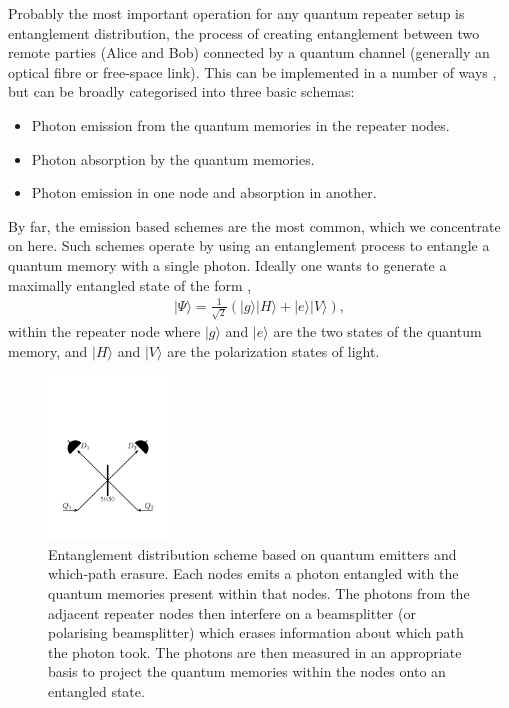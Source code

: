 \documentclass[twocolumn, aps, rmp, amsmath, amssymb, nofootinbib, superscriptaddress, longbibliography, floatfix, table-of-contents, eqsecnum]{revtex4-1}
\newcommand{\ket}[1]{|#1\rangle}
\begin{document}
Probably the most important operation for any quantum repeater setup is entanglement distribution, the process of creating entanglement between two remote parties (Alice and Bob) connected by a quantum channel (generally an optical fibre or free-space link). This can be implemented in a number of ways \cite{bib:Bennett96, bib:nk98, bib:bennett93, bib:SSRG09, bib:childress06, bib:loock06, bib:munro08}, but can be broadly categorised into three basic schemas:
\begin{itemize}
\item Photon emission from the quantum memories in the repeater nodes.
\item Photon absorption by the quantum memories.
\item Photon emission in one node and absorption in another.
\end{itemize}
By far, the emission based schemes are the most common, which we concentrate on here. Such schemes operate by using an entanglement process to entangle a quantum memory with a single photon. Ideally one wants to generate a maximally entangled state of the form \cite{bib:WJM2015},
\begin{align}
|\Psi\rangle=\frac{1}{\sqrt{2}} (|g\rangle |H\rangle + |e\rangle |V\rangle),
\end{align}
within the repeater node where $\ket{g}$ and $\ket{e}$ are the two states of the quantum memory, and $\ket{H}$ and $\ket{V}$ are the polarization states of light. 
\begin{figure}[!htb]
\includegraphics[width=0.3\textwidth]{repeaters_3}
\caption{Entanglement distribution scheme based on quantum emitters and which-path erasure. Each nodes emits a photon entangled with the quantum memories present within that nodes. The photons from the adjacent repeater nodes then interfere on a beamsplitter (or polarising beamsplitter) which erases information about which path the photon took. The photons are then measured in an appropriate basis to project the quantum memories within the nodes onto an entangled state.} 
\label{fig:repeaters_3}
\end{figure} 
\end{document}
